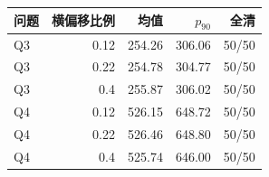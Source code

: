 \begin{tabular}{lrrrr}
\toprule
问题 & 横偏移比例 & 均值 & $p_{90}$ & 全清 \\
\midrule
Q3 & 0.12 & 254.26 & 306.06 & 50/50 \\
Q3 & 0.22 & 254.78 & 304.77 & 50/50 \\
Q3 & 0.4 & 255.87 & 306.02 & 50/50 \\
Q4 & 0.12 & 526.15 & 648.72 & 50/50 \\
Q4 & 0.22 & 526.46 & 648.80 & 50/50 \\
Q4 & 0.4 & 525.74 & 646.00 & 50/50 \\
\bottomrule
\end{tabular}
